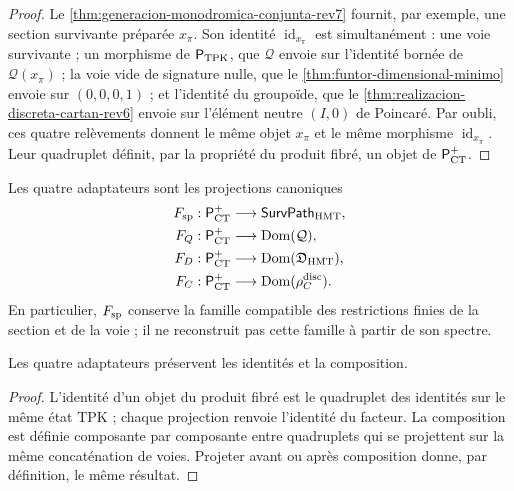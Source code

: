 \begin{proof}
Le \cref{thm:generacion-monodromica-conjunta-rev7} fournit, par exemple,
une section survivante préparée \(x_\pi\). Son identité
\(\operatorname{id}_{x_\pi}\) est simultanément : une voie survivante ;
un morphisme de \(\mathsf P_{\rm TPK}\), que \(\mathcal Q\) envoie sur
l'identité bornée de \(\mathcal Q(x_\pi)\) ; la voie vide de signature nulle,
que le \cref{thm:funtor-dimensional-minimo} envoie sur
\((0,0,0,1)\) ; et l'identité du groupoïde, que le
\cref{thm:realizacion-discreta-cartan-rev6} envoie sur l'élément neutre
\((I,0)\) de Poincaré. Par oubli, ces quatre relèvements donnent le même objet
\(x_\pi\) et le même morphisme \(\operatorname{id}_{x_\pi}\). Leur quadruplet
définit, par la propriété du produit fibré, un objet de
\(\mathsf P_{\rm CT}^{+}\).
\end{proof}

\begin{definition}
\label{def:int68-pct-positive}
Les quatre adaptateurs sont les projections canoniques
\[
 \begin{aligned}
 F_{\rm sp}:\mathsf P_{\rm CT}^{+}&\longrightarrow
     \mathsf{SurvPath}_{\rm HMT},\\
 F_Q:\mathsf P_{\rm CT}^{+}&\longrightarrow\operatorname{Dom}(\mathcal Q),\\
 F_D:\mathsf P_{\rm CT}^{+}&\longrightarrow
     \operatorname{Dom}(\mathfrak D_{\rm HMT}),\\
 F_C:\mathsf P_{\rm CT}^{+}&\longrightarrow
     \operatorname{Dom}(\rho_C^{\rm disc}).
 \end{aligned}
\]
En particulier, \(F_{\rm sp}\) conserve la famille compatible des
restrictions finies de la section et de la voie ; il ne reconstruit pas cette famille
à partir de son spectre.
\end{definition}

\begin{lemma}
\label{lem:int68-adaptadores}
Les quatre adaptateurs préservent les identités et la composition.
\end{lemma}

\begin{proof}
L'identité d'un objet du produit fibré est le quadruplet des identités
sur le même état TPK ; chaque projection renvoie l'identité du facteur.
La composition est définie composante par composante entre quadruplets qui
se projettent sur la même concaténation de voies. Projeter avant ou après
composition donne, par définition, le même résultat.
\end{proof}

